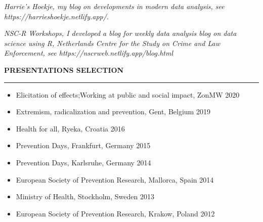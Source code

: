 \documentclass[
  16,
]{article}
\begin{document}

\emph{Harrie's Hoekje, my blog on developments in modern data analysis, see https://harrieshoekje.netlify.app/}.

\emph{NSC-R Workshops, I developed a blog for weekly data analysis blog on data science using R, Netherlands Centre for the Study on Crime and Law Enforcement, see https://nscrweb.netlify.app/blog.html}

\begin{large}
  {\bf PRESENTATIONS SELECTION}
  \vspace{3pt}
  \hrule
\end{large}

\begin{itemize}
\item
  Elicitation of effects;Working at public and social impact, ZonMW
  \textbar{} 2020
\item
  Extremism, radicalization and prevention, Gent, Belgium \textbar{}
  2019
\item
  Health for all, Ryeka, Croatia \textbar{} 2016
\item
  Prevention Days, Frankfurt, Germany \textbar{} 2015
\item
  Prevention Days, Karlsruhe, Germany \textbar{} 2014
\item
  European Society of Prevention Research, Mallorca, Spain \textbar{}
  2014
\item
  Ministry of Health, Stockholm, Sweden \textbar{} 2013
\item
  European Society of Prevention Research, Krakow, Poland \textbar{}
  2012
\end{itemize}
\end{document}
